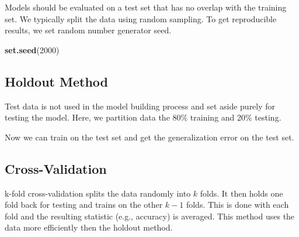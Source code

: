 \documentclass[
  notitlepage]{book}
\newenvironment{Shaded}{\begin{snugshade}}{\end{snugshade}}
\newcommand{\DataTypeTok}[1]{\textcolor[rgb]{0.13,0.29,0.53}{#1}}
\newcommand{\DecValTok}[1]{\textcolor[rgb]{0.00,0.00,0.81}{#1}}
\newcommand{\ErrorTok}[1]{\textcolor[rgb]{0.64,0.00,0.00}{\textbf{#1}}}
\newcommand{\FloatTok}[1]{\textcolor[rgb]{0.00,0.00,0.81}{#1}}
\newcommand{\KeywordTok}[1]{\textcolor[rgb]{0.13,0.29,0.53}{\textbf{#1}}}
\newcommand{\NormalTok}[1]{#1}
\newcommand{\OperatorTok}[1]{\textcolor[rgb]{0.81,0.36,0.00}{\textbf{#1}}}
\newcommand{\StringTok}[1]{\textcolor[rgb]{0.31,0.60,0.02}{#1}}
\begin{document}
Models should be evaluated on a test set that has no overlap with the
training set. We typically split the data using random sampling.
To get reproducible results,
we set random number generator seed.

\begin{Shaded}
\begin{Highlighting}[]
\KeywordTok{set.seed}\NormalTok{(}\DecValTok{2000}\NormalTok{)}
\end{Highlighting}
\end{Shaded}

\hypertarget{holdout-method}{%
\subsection{Holdout Method}\label{holdout-method}}

Test data is not used in the model building process and set aside purely
for testing the model. Here, we partition data the 80\% training and 20\%
testing.

\begin{Shaded}
\end{Shaded}

Now we can train on the test set and get the generalization error on the
test set.

\hypertarget{cross-validation}{%
\subsection{Cross-Validation}\label{cross-validation}}

k-fold cross-validation splits the data randomly into \(k\) folds. It then
holds one fold back for testing and trains on the other \(k-1\) folds. This is
done with each fold and the resulting statistic (e.g., accuracy) is averaged.
This method uses the data more efficiently then the holdout method.
\end{document}
